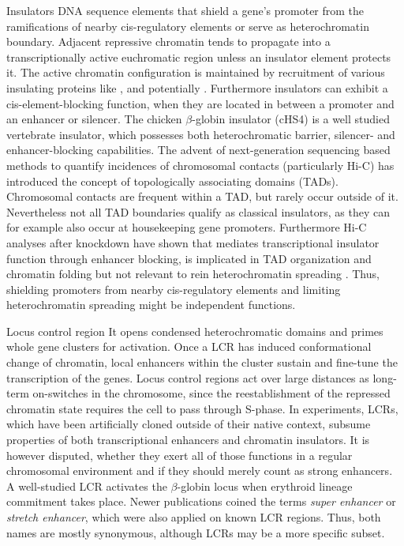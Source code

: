 \begin{mydescription}{0.5cm}
	\item[Insulators] DNA sequence elements that shield a gene's promoter from the ramifications of nearby cis-regulatory elements or serve as heterochromatin boundary. Adjacent repressive chromatin tends to propagate into a transcriptionally active euchromatic region unless an insulator element protects it\cite{Donze2002}. The active chromatin configuration is maintained by recruitment of various insulating proteins like ,  and potentially \cite{Gaszner2006,Barkess2012,Ong2014}. Furthermore insulators can exhibit a cis-element-blocking function, when they are located in between a promoter and an enhancer or silencer. The chicken \ensuremath{\beta}-globin insulator (cHS4) is a well studied vertebrate insulator, which possesses both heterochromatic barrier, silencer- and enhancer-blocking capabilities\cite{Walters1999,Yao2003,Rincon-Arano2007}. The advent of next-generation sequencing based methods to quantify incidences of chromosomal contacts (particularly Hi-C\cite{Lieberman-Aiden2009}) has introduced the concept of topologically associating domains (TADs)\cite{Dixon2012,Jost2014}. Chromosomal contacts are frequent within a TAD, but rarely occur outside of it. Nevertheless not all TAD boundaries qualify as classical insulators, as they can for example also occur at housekeeping gene promoters\cite{Hug2017,Flyamer2017}. Furthermore Hi-C analyses after  knockdown have shown that  mediates transcriptional insulator function through enhancer blocking, is implicated in TAD organization and chromatin folding but not relevant to rein heterochromatin spreading \cite{Nora2017}. Thus, shielding promoters from nearby cis-regulatory elements and limiting heterochromatin spreading might be independent functions. 
	
	\item [Locus control region] It opens condensed heterochromatic domains and primes whole gene clusters for activation. Once a LCR has induced conformational change of chromatin, local enhancers within the cluster sustain and fine-tune the transcription of the genes.
	Locus control regions act over large distances as long-term on-switches in the chromosome, since the reestablishment of the repressed chromatin state requires the cell to pass through S-phase\cite{Li2002}. In experiments, LCRs, which have been artificially cloned outside of their native context, subsume properties of both transcriptional enhancers and chromatin insulators. It is however disputed, whether they exert all of those functions in a regular chromosomal environment and if they should merely count as strong enhancers\cite{Bulger2013}. A well-studied LCR activates the \ensuremath{\beta}-globin locus when erythroid lineage commitment takes place\cite{Forrester1990,Jimenez1992,Allahyar2018}. Newer publications coined the terms \emph{super enhancer}\cite{Hnisz2013} or \emph{stretch enhancer}, which were also applied on known LCR regions. Thus, both names are mostly synonymous, although LCRs may be a more specific subset. 
	

\end{mydescription}
